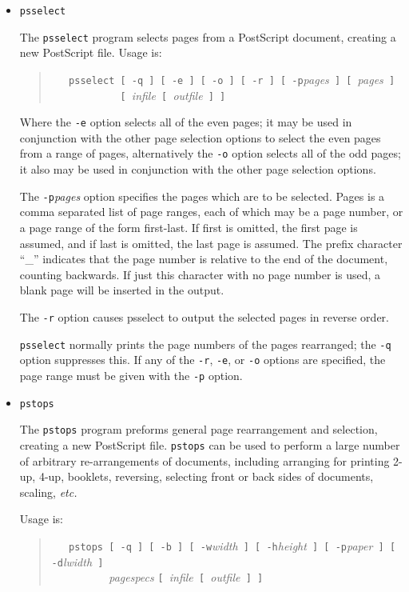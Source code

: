 \documentclass[twoside,11pt]{article}
\begin{document}
\begin{itemize}
\item {\tt psselect}

The {\tt psselect} program selects pages from a PostScript document, creating a new PostScript file. Usage is: 

\begin{quote}
\verb+   psselect [ -q ] [ -e ] [ -o ] [ -r ] [ -p+{\em pages}\verb+ ] [ +{\em pages}\verb+ ]+\\
\verb+            [ +{\em infile}\verb+ [ +{\em outfile}\verb+ ] ]+
\end{quote}

Where the {\tt -e} option selects all of the even pages; it may be used in conjunction with the other page selection options to select the even pages from a range of pages, alternatively the {\tt -o} option selects all of the odd pages; it also may be used in conjunction with the other page selection options.
 
The {\tt -p}{\em pages} option specifies the pages which are to be selected. Pages is a comma separated list of page ranges, each of which may be a page
number, or a page range of the form first-last. If first is omitted, the first page is assumed, and if last is omitted, the last page is assumed. The prefix
character ``\_'' indicates that the page number is relative to the end of the document, counting backwards. If just this character with no page number is
used, a blank page will be inserted in the output. 

The {\tt -r} option causes psselect to output the selected pages in reverse order. 

{\tt psselect} normally prints the page numbers of the pages rearranged; the {\tt -q} option suppresses this.  If any of the {\tt -r}, {\tt -e}, or {\tt -o} options are specified, the page range must be given with the {\tt -p} option. 

\item {\tt pstops}

The {\tt pstops} program preforms general page rearrangement and selection, creating a new PostScript file. {\tt pstops} can be used to perform a large number of arbitrary re-arrangements of documents, including arranging for printing 2-up, 4-up, booklets, reversing, selecting front or back sides of documents, scaling, {\em etc.\ }

Usage is:

\begin{quote}
\verb+   pstops [ -q ] [ -b ] [ -w+{\em width}\verb+ ] [ -h+{\em height}\verb+ ] [ -p+{\em paper}\verb+ ] [ -d+{\em lwidth}\verb+ ] +\\
\verb+          +{\em pagespecs} \verb+[ +{\em infile}\verb+ [ +{\em outfile}\verb+ ] ]+
\end{quote}


\end{itemize}
\end{document}
